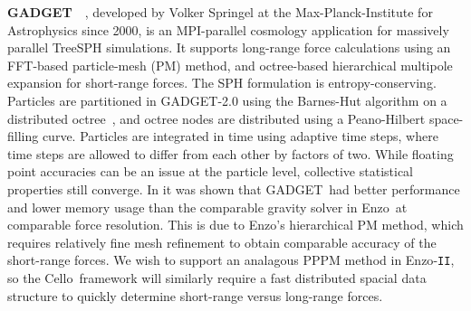 \documentclass[11pt,letterpaper]{article}
\newcommand{\cello}{\textsf{Cello}}
\newcommand{\enzo}{\textsf{Enzo}}
\newcommand{\enzoii}{\textsf{Enzo}-\texttt{II}}
\newcommand{\gadget}{\textsf{GADGET}}
\begin{document}
\textbf{\gadget}~\cite{wwwgadget}~\cite{Sp05}, developed by Volker
Springel at the Max-Planck-Institute for Astrophysics since 2000, is
an MPI-parallel cosmology application for massively parallel TreeSPH
simulations.  It supports long-range force calculations using an
FFT-based particle-mesh (PM) method, and octree-based hierarchical
multipole expansion for short-range forces.  The SPH formulation is
entropy-conserving.
%
Particles are partitioned in \gadget-2.0 using the Barnes-Hut
algorithm on a distributed octree~\cite{BaHu86}, and octree nodes are
distributed using a Peano-Hilbert space-filling curve.  Particles are
integrated in time using adaptive time steps, where time steps are
allowed to differ from each other by factors of two.
%
While floating point accuracies can be an issue at the particle level,
collective statistical properties still converge.  In \cite{OsNa05} it
was shown that \gadget\ had better performance and lower memory usage
than the comparable gravity solver in \enzo\ at comparable force
resolution.  This is due to \enzo's hierarchical PM method, which
requires relatively fine mesh refinement to obtain comparable accuracy
of the short-range forces.
%
We wish to support an analagous PPPM method in \enzoii, so the \cello\
framework will similarly require a fast distributed spacial data
structure to quickly determine short-range versus long-range forces.
\end{document}
